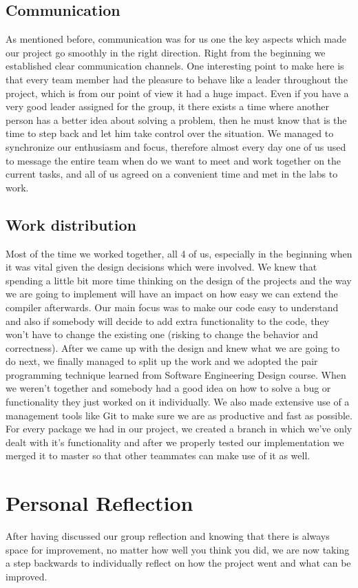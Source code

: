 \documentclass[11pt]{article}
\begin{document}
\subsection{Communication}
As mentioned before, communication was for us one the key aspects which made our
project go smoothly in the right direction. Right from the beginning we established
clear communication channels. One interesting point to make here is that every team
member had the pleasure to behave like a leader throughout the project, which is
from our point of view it had a huge impact. Even if you have a very good leader
assigned for the group, it there exists a time where another person has a better
idea about solving a problem, then he must know that is the time to step back and
let him take control over the situation. We managed to synchronize our enthusiasm
and focus, therefore almost every day one of us used to message the entire team
when do we want to meet and work together on the current tasks, and all of us agreed
on a convenient time and met in the labs to work.

\subsection{Work distribution}
Most of the time we worked together, all 4 of us, especially in the beginning
when it was vital given the design decisions which were involved. We knew that
spending a little bit more time thinking on the design of the projects and the
way we are going to implement will have an impact on how easy we can extend the
compiler afterwards. Our main focus was to make our code easy to understand and
also if somebody will decide to add extra functionality to the code, they won't
have to change the existing one (risking to change the behavior and correctness).
After we came up with the design and knew what we are going to do next, we finally
managed to split up the work and we adopted the pair programming technique learned
from Software Engineering Design course. When we weren't together and somebody had
a good idea on how to solve a bug or functionality they just worked on it individually.
We also made extensive use of a management tools like Git to make sure we are as
productive and fast as possible. For every package we had in our project, we created
a branch in which we've only dealt with it's functionality and after we properly
tested our implementation we merged it to master so that other teammates can make
use of it as well.

\section{Personal Reflection}
After having discussed our group reflection and knowing that there is always
space for improvement, no matter how well you think you did, we are now taking
a step backwards to individually reflect on how the project went and what can be improved.
\end{document}
